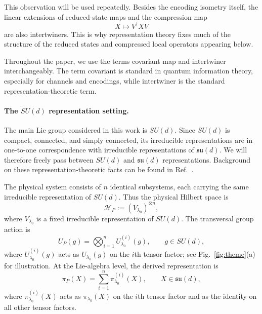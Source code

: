 \documentclass[10pt,twocolumn,superscriptaddress,aps,amsmath,amssymb,citeautoscript,floatfix,prx,longbibliography]{revtex4-2}
\newcounter{alg}
\theoremstyle{plain}
\theoremstyle{plain}
\theoremstyle{plain}
\theoremstyle{plain}
\theoremstyle{plain}
\theoremstyle{plain}
\begin{document}
This observation will be used repeatedly. Besides the encoding isometry itself, the linear extensions of reduced-state maps and the compression map
$$
X
\longmapsto
V^\dagger X V
$$
are also intertwiners. This is why representation theory fixes much of the structure of the reduced states and compressed local operators appearing below.

Throughout the paper, we use the terms covariant map and intertwiner interchangeably. The term covariant is standard in quantum information theory, especially for channels and encodings, while intertwiner is the standard representation-theoretic term.

\paragraph{The $SU(d)$ representation setting.}

The main Lie group considered in this work is $SU(d)$. Since $SU(d)$ is compact, connected, and simply connected, its irreducible representations are in one-to-one correspondence with irreducible representations of $\mathfrak{su}(d)$. We will therefore freely pass between $SU(d)$ and $\mathfrak{su}(d)$ representations. Background on these representation-theoretic facts can be found in Ref.~\cite{Hall2015}.

The physical system consists of $n$ identical subsystems, each carrying the same irreducible representation of $SU(d)$. Thus the physical Hilbert space is
\begin{equation}\label{eq:phys_space_rep}
\mathcal H_P
:=
(V_{\lambda_0})^{\otimes n},
\end{equation}
where $V_{\lambda_0}$ is a fixed irreducible representation of $SU(d)$. The transversal group action is
\begin{equation}\label{eq:group_phys_space_rep}
U_P(g)
=
\bigotimes_{i=1}^n
U_{\lambda_0}^{(i)}(g),
\qquad
g\in SU(d),
\end{equation}
where $U_{\lambda_0}^{(i)}(g)$ acts as $U_{\lambda_0}(g)$ on the $i$th tensor factor; see Fig.~\ref{fig:theme}(a) for illustration. At the Lie-algebra level, the derived representation is
\begin{equation}\label{eq:alg_phys_space_rep}
\pi_P(X)
=
\sum_{i=1}^n
\pi_{\lambda_0}^{(i)}(X),
\qquad
X\in\mathfrak{su}(d),
\end{equation}
where $\pi_{\lambda_0}^{(i)}(X)$ acts as $\pi_{\lambda_0}(X)$ on the $i$th tensor factor and as the identity on all other tensor factors.
\end{document}
